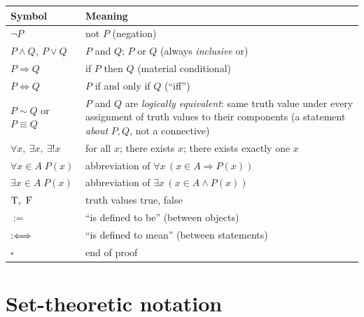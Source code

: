 \begin{longtable}{@{}p{3.6cm}p{11cm}@{}}
	\toprule
	\textbf{Symbol} & \textbf{Meaning}\\
	\midrule
	\endhead
	$\neg P$ & not $P$ (negation)\\
	$P\wedge Q,\ P\vee Q$ & $P$ and $Q$; $P$ or $Q$ (always \emph{inclusive} or)\\
	$P\Rightarrow Q$ & if $P$ then $Q$ (material conditional)\\
	$P\Leftrightarrow Q$ & $P$ if and only if $Q$ (``iff'')\\
	$P\sim Q$ or $P\equiv Q$ & $P$ and $Q$ are \emph{logically equivalent}: same truth value under every assignment of truth values to their components (a statement \emph{about} $P,Q$, not a connective)\\
	$\forall x,\ \exists x,\ \exists!x$ & for all $x$; there exists $x$; there exists exactly one $x$\\
	$\forall x\in A\;P(x)$ & abbreviation of $\forall x\,(x\in A\Rightarrow P(x))$\\
	$\exists x\in A\;P(x)$ & abbreviation of $\exists x\,(x\in A\wedge P(x))$\\
	$\T,\ \F$ & truth values true, false\\
	$:=$ & ``is defined to be'' (between objects)\\
	$:\Longleftrightarrow$ & ``is defined to mean'' (between statements)\\
	$\square$ & end of proof\\
	\bottomrule
\end{longtable}

\section*{Set-theoretic notation}

